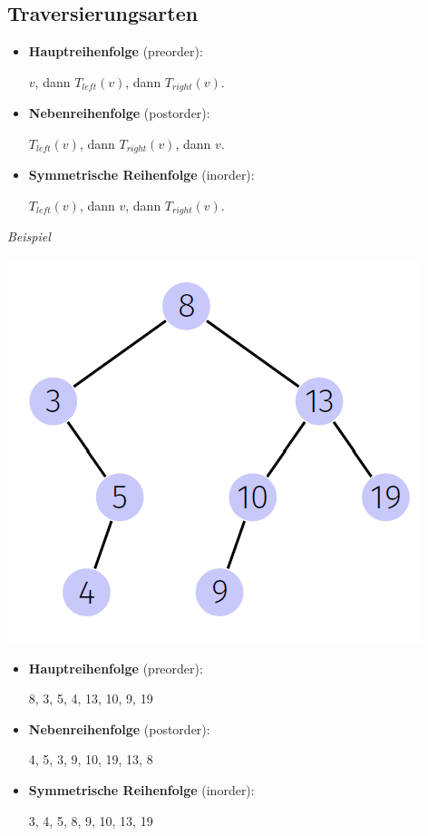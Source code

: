 \begin{sectionbox}
\subsection{Traversierungsarten}\smallskip
\begin{greenbox}
\begin{itemize}
    \item \textbf{Hauptreihenfolge} (preorder):
    \par $v$, dann $T_{left}(v)$, dann $T_{right}(v)$.
    \item \textbf{Nebenreihenfolge} (postorder):
    \par $T_{left}(v)$, dann $T_{right}(v)$, dann $v$.
    \item \textbf{Symmetrische Reihenfolge} (inorder):
    \par $T_{left}(v)$, dann $v$, dann $T_{right}(v)$.
\end{itemize}
\end{greenbox}\smallskip

\textit{Beispiel}\par
\includegraphics[width = 0.4\columnwidth]{../img/BspBST.png}
\smallskip
\begin{itemize}
    \item \textbf{Hauptreihenfolge} (preorder):
    \par 8, 3, 5, 4, 13, 10, 9, 19
    \item \textbf{Nebenreihenfolge} (postorder):
    \par 4, 5, 3, 9, 10, 19, 13, 8
    \item \textbf{Symmetrische Reihenfolge} (inorder):
    \par 3, 4, 5, 8, 9, 10, 13, 19
\end{itemize}

\end{sectionbox}
